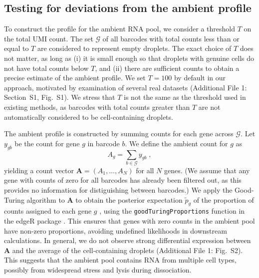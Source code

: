 \documentclass{bmcart}
\newcommand{\code}[1]{\texttt{#1}}
\newcommand{\ADD}[1]{Additional File 1: #1}
\newcommand{\suppfignegative}{S1}
\newcommand{\suppfigambientma}{S2}
\newcommand{\suppsecthreshold}{S1}
\begin{document}
\subsection*{Testing for deviations from the ambient profile}
To construct the profile for the ambient RNA pool, we consider a threshold $T$ on the total UMI count.
The set $\mathcal{G}$ of all barcodes with total counts less than or equal to $T$ are considered to represent empty droplets.
The exact choice of $T$ does not matter, as long as (i) it is small enough so that droplets with genuine cells do not have total counts below $T$,
and (ii) there are sufficient counts to obtain a precise estimate of the ambient profile.
We set $T=100$ by default in our approach, motivated by examination of several real datasets (\ADD{Section~\suppsecthreshold{}, Fig.~\suppfignegative{}}).
We stress that $T$ is not the same as the threshold used in existing methods, as barcodes with total counts greater than $T$ are not automatically considered to be cell-containing droplets.

The ambient profile is constructed by summing counts for each gene across $\mathcal{G}$.
Let $y_{gb}$ be the count for gene $g$ in barcode $b$.
We define the ambient count for $g$ as 
\[
    A_{g} = \sum_{b \in \mathcal{G}} y_{gb} \;,
\]
yielding a count vector $\mathbf{A} = (A_1, \dots, A_N)$ for all $N$ genes.
(We assume that any gene with counts of zero for all barcodes has already been filtered out, as this provides no information for distiguishing between barcodes.)
We apply the Good-Turing algorithm to $\mathbf{A}$ to obtain the posterior expectation $\tilde{p}_g$ of the proportion of counts assigned to each gene $g$ \cite{gale1995good}, using the \code{goodTuringProportions} function in the \textsf{edgeR} package \cite{robinson2010edgeR}.
This ensures that genes with zero counts in the ambient pool have non-zero proportions, avoiding undefined likelihoods in downstream calculations.
In general, we do not observe strong differential expression between $\mathbf{A}$ and the average of the cell-containing droplets (\ADD{Fig.~\suppfigambientma{}}).
This suggests that the ambient pool contains RNA from multiple cell types, possibly from widespread stress and lysis during dissociation.
\end{document}
